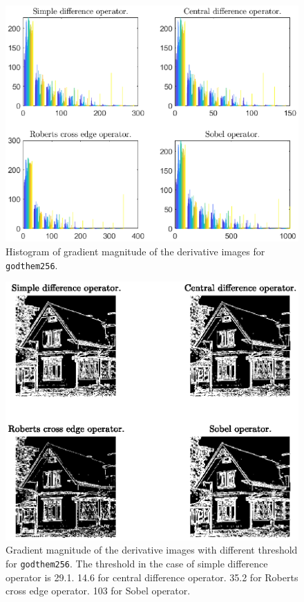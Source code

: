 \documentclass[11pt,a4paper]{article}
\begin{document}
	\begin{figure}[!ht]
		\centering
		\includegraphics[width=0.9\columnwidth]{Question_2_Godthem_Hist.eps}
		\caption{Histogram of gradient magnitude of the derivative images for \texttt{godthem256}.}
		\label{fig:Question_2_Godthem_Hist}
	\end{figure}
	\begin{figure}[!ht]
		\centering
		\includegraphics[width=0.85\columnwidth]{Question_2_Godthem_Threshold.eps}
		\caption{Gradient magnitude of the derivative images with different threshold for \texttt{godthem256}. The threshold in the case of simple difference operator is 29.1. 14.6 for central difference operator. 35.2 for Roberts cross edge operator. 103 for Sobel operator.}
		\label{fig:Question_2_Godthem_Threshold}
	\end{figure}
\end{document}
